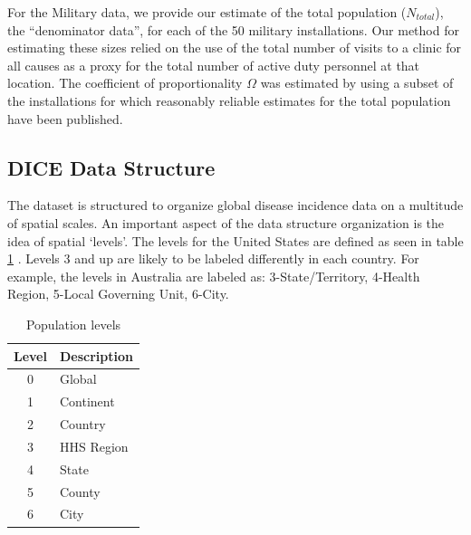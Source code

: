 \documentclass[a4paper]{article}
\begin{document}
%


For the Military data, we provide our estimate of the total population ($N_{total}$), the ``denominator data'', for each of the 50 military installations.
Our method for estimating these sizes relied on the use of the total number of visits to a clinic for all causes as a proxy for the total number of active duty personnel at that location. The
coefficient of proportionality $\Omega$ was estimated by using a subset of the installations for which reasonably reliable estimates for the total population have been published.


\subsection*{DICE Data Structure}
The  dataset is structured to organize global disease incidence data on a multitude of spatial scales.  An important aspect of the data structure organization is the idea of spatial `levels'. The levels for the United States are defined as seen in table \ref{tab:levels} . Levels 3 and up are likely to be labeled differently in each country.  For example, the levels in Australia are labeled as: 3-State/Territory, 4-Health Region, 5-Local Governing Unit, 6-City.

\begin{table}[h]
  \caption{Population levels}
  \centering
  \begin{tabular}{| c | l |}
    \hline
    Level & Description \\ \hline
    0 & Global \\ \hline
    1 & Continent \\  \hline
    2 & Country \\  \hline
    3 & HHS Region \\  \hline
    4 & State \\ \hline
    5 & County \\ \hline
    6 & City \\ \hline
  \end{tabular}
  \label{tab:levels}
\end{table}
\end{document}

